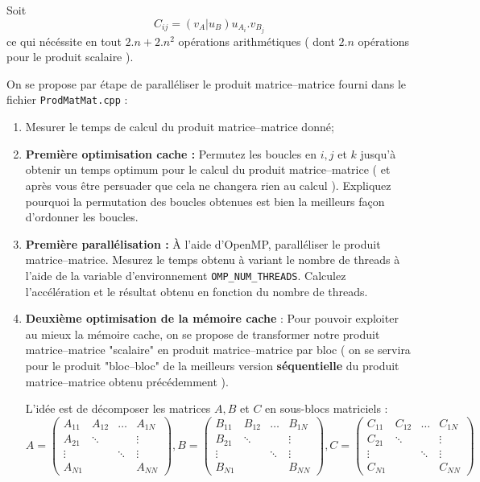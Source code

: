 \documentclass[11pt,a4paper]{article}
\begin{document}
Soit
\[
C_{ij} = \left(v_{A}|u_{B}\right)u_{A_{i}}.v_{B_{j}}
\]
ce qui nécéssite en tout $2.n+2.n^{2}$ opérations arithmétiques ( dont $2.n$ opérations pour le produit scalaire ).

On se propose par étape de paralléliser le produit matrice--matrice fourni dans le fichier \texttt{ProdMatMat.cpp} :

\begin{enumerate}
	\item Mesurer le temps de calcul du produit matrice--matrice donné;
	\item \textbf{\color{blue}Première optimisation cache :} Permutez les  boucles en $i,j$ et $k$ jusqu'à obtenir un temps optimum
	pour le calcul du produit matrice--matrice ( et après vous être persuader que cela ne changera rien au calcul ). Expliquez pourquoi
	la permutation des boucles obtenues est bien la meilleurs façon d'ordonner les boucles.
	\item \textbf{\color{blue}Première parallélisation : } \`A l'aide d'OpenMP, paralléliser le produit matrice--matrice. Mesurez le temps obtenu
	à variant le nombre de threads à l'aide de la variable d'environnement \texttt{OMP\_NUM\_THREADS}. Calculez l'accélération et le résultat obtenu en fonction du nombre de threads.
	\item \textbf{\color{blue}Deuxième optimisation de la mémoire cache }: 
	Pour pouvoir exploiter au mieux la mémoire cache, on se propose de transformer notre produit matrice--matrice "scalaire" en produit matrice--matrice
	par bloc ( on se servira pour le produit "bloc--bloc" de la meilleurs version \textbf{séquentielle} du produit matrice--matrice obtenu précédemment ).

	L'idée est de décomposer les matrices $A,B$ et $C$ en sous-blocs matriciels :
	\[
	A = \left(
	\begin{array}{cccc}
	A_{11} & A_{12} & \ldots & A_{1N} \\
	A_{21} & \ddots &        & \vdots \\
	\vdots &        & \ddots & \vdots \\
	A_{N1} &        &        & A_{NN}
	\end{array}
	\right),
	B = \left(
	\begin{array}{cccc}
	B_{11} & B_{12} & \ldots & B_{1N} \\
	B_{21} & \ddots &        & \vdots \\
	\vdots &        & \ddots & \vdots \\
	B_{N1} &        &        & B_{NN}
	\end{array}
	\right),
	C = \left(
	\begin{array}{cccc}
	C_{11} & C_{12} & \ldots & C_{1N} \\
	C_{21} & \ddots &        & \vdots \\
	\vdots &        & \ddots & \vdots \\
	C_{N1} &        &        & C_{NN}
	\end{array}
	\right)
	\]


\end{enumerate}
\end{document}
